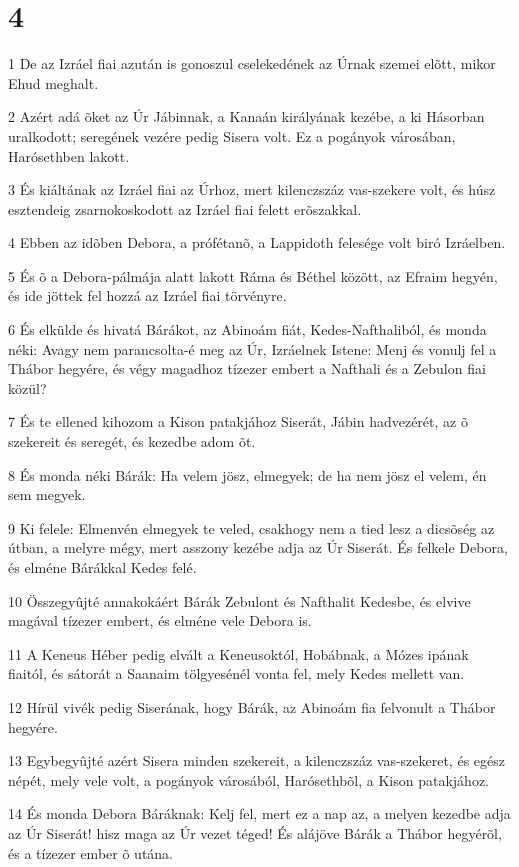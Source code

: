 \chapter{4}

\par 1 De az Izráel fiai azután is gonoszul cselekedének az Úrnak szemei elõtt, mikor Ehud meghalt.
\par 2 Azért adá õket az Úr Jábinnak, a Kanaán királyának kezébe, a ki Hásorban uralkodott; seregének vezére pedig Sisera volt. Ez a pogányok városában, Harósethben lakott.
\par 3 És kiáltának az Izráel fiai az Úrhoz, mert kilenczszáz vas-szekere volt, és húsz esztendeig zsarnokoskodott az Izráel fiai felett erõszakkal.
\par 4 Ebben az idõben Debora, a prófétanõ, a Lappidoth felesége volt biró Izráelben.
\par 5 És õ a Debora-pálmája alatt lakott Ráma és Béthel között, az Efraim hegyén, és ide jöttek fel hozzá az Izráel fiai törvényre.
\par 6 És elkülde és hivatá Bárákot, az Abinoám fiát, Kedes-Nafthaliból, és monda néki: Avagy nem parancsolta-é meg az Úr, Izráelnek Istene: Menj és vonulj fel a Thábor hegyére, és végy magadhoz tízezer embert a Nafthali és a Zebulon fiai közül?
\par 7 És te ellened kihozom a Kison patakjához Siserát, Jábin hadvezérét, az õ szekereit és seregét, és kezedbe adom õt.
\par 8 És monda néki Bárák: Ha velem jösz, elmegyek; de ha nem jösz el velem, én sem megyek.
\par 9 Ki felele: Elmenvén elmegyek te veled, csakhogy nem a tied lesz a dicsõség az útban, a melyre mégy, mert asszony kezébe adja az Úr Siserát. És felkele Debora, és elméne Bárákkal Kedes felé.
\par 10 Összegyûjté annakokáért Bárák Zebulont és Nafthalit Kedesbe, és elvive magával tízezer embert, és elméne vele Debora is.
\par 11 A Keneus Héber pedig elvált a Keneusoktól, Hobábnak, a Mózes ipának fiaitól, és sátorát a  Saanaim tölgyesénél vonta fel, mely Kedes mellett van.
\par 12 Hírül vivék pedig Siserának, hogy Bárák, az Abinoám fia felvonult a Thábor hegyére.
\par 13 Egybegyûjté azért Sisera minden szekereit, a kilenczszáz vas-szekeret, és egész népét, mely vele volt, a pogányok városából, Harósethbõl, a Kison patakjához.
\par 14 És monda Debora Báráknak: Kelj fel, mert ez a nap az, a melyen kezedbe adja az Úr Siserát! hisz maga az Úr vezet téged! És alájöve Bárák a Thábor hegyérõl, és a tízezer ember õ utána.
